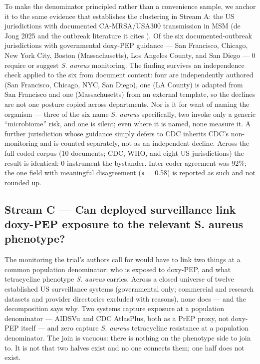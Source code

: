 \documentclass[10pt,letterpaper]{article}
\begin{document}
To make the denominator principled rather than a convenience sample, we
anchor it to the same evidence that establishes the clustering in Stream
A: the US jurisdictions with documented CA-MRSA/USA300 transmission in
MSM (de Jong 2025 and the outbreak literature it cites
\cite{dejong2025, diep2008}). Of the six documented-outbreak
jurisdictions with governmental doxy-PEP guidance --- San Francisco,
Chicago, New York City, Boston (Massachusetts), Los Angeles County, and
San Diego --- 0 require or suggest \emph{S. aureus} monitoring.
The finding survives an independence check applied to the six from
document content: four are independently authored (San Francisco,
Chicago, NYC, San Diego), one (LA County) is adapted from San Francisco
and one (Massachusetts) from an external template, so the declines are
not one posture copied across departments. Nor is it for want of naming
the organism --- three of the six name \emph{S. aureus} specifically,
two invoke only a generic ``microbiome'' risk, and one is silent; even
where it is named, none measure it. A further jurisdiction whose
guidance simply defers to CDC inherits CDC's non-monitoring and is
counted separately, not as an independent decline. Across the full coded
corpus (10 documents; CDC, WHO, and eight US jurisdictions) the result
is identical: 0 instrument the bystander. Inter-coder agreement was
92\%; the one field with meaningful disagreement (κ = 0.58) is reported
as such and not rounded up.


\subsection*{Stream C --- Can deployed surveillance link doxy-PEP exposure to the relevant S. aureus phenotype?}

The monitoring the trial's authors call for would have to link two
things at a common population denominator: who is exposed to doxy-PEP,
and what tetracycline phenotype \emph{S. aureus} carries. Across a
closed universe of twelve established US surveillance systems
(governmental only; commercial and research datasets and provider
directories excluded with reasons), none does --- and the decomposition
says why. Two systems capture exposure at a population denominator ---
AIDSVu and CDC AtlasPlus, both as a PrEP proxy, not doxy-PEP
itself \cite{aidsvu} --- and zero capture \emph{S. aureus}
tetracycline resistance at a population denominator. The join is
vacuous: there is nothing on the phenotype side to join to. It is not
that two halves exist and no one connects them; one half does not exist.
\end{document}
